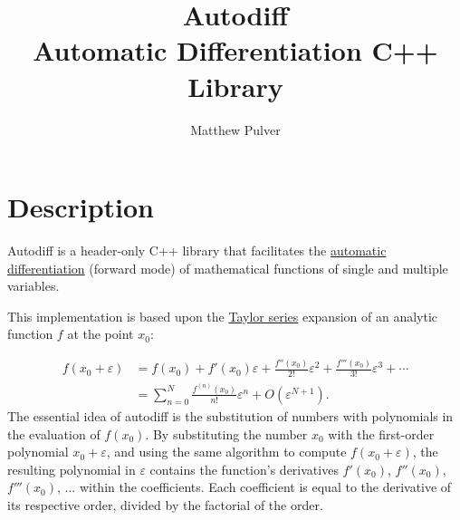 \documentclass{article}
\begin{document}
\title{Autodiff\\
\large Automatic Differentiation C++ Library}
\author{Matthew Pulver}
\maketitle



\tableofcontents


\newpage

\section{Description}

Autodiff is a header-only C++ library that facilitates the
\href{https://en.wikipedia.org/wiki/Automatic_differentiation}{automatic differentiation} (forward mode) of
mathematical functions of single and multiple variables.

This implementation is based upon the \href{https://en.wikipedia.org/wiki/Taylor_series}{Taylor series} expansion of
an analytic function $f$ at the point $x_0$:

\begin{align*}
f(x_0+\varepsilon) &= f(x_0) + f'(x_0)\varepsilon + \frac{f''(x_0)}{2!}\varepsilon^2 + \frac{f'''(x_0)}{3!}\varepsilon^3 + \cdots \\
  &= \sum_{n=0}^N\frac{f^{(n)}(x_0)}{n!}\varepsilon^n + O\left(\varepsilon^{N+1}\right).
\end{align*}
The essential idea of autodiff is the substitution of numbers with polynomials in the evaluation of $f(x_0)$. By
substituting the number $x_0$ with the first-order polynomial $x_0+\varepsilon$, and using the same algorithm
to compute $f(x_0+\varepsilon)$, the resulting polynomial in $\varepsilon$ contains the function's derivatives
$f'(x_0)$, $f''(x_0)$, $f'''(x_0)$, ...  within the coefficients. Each coefficient is equal to the derivative of
its respective order, divided by the factorial of the order.
\end{document}
